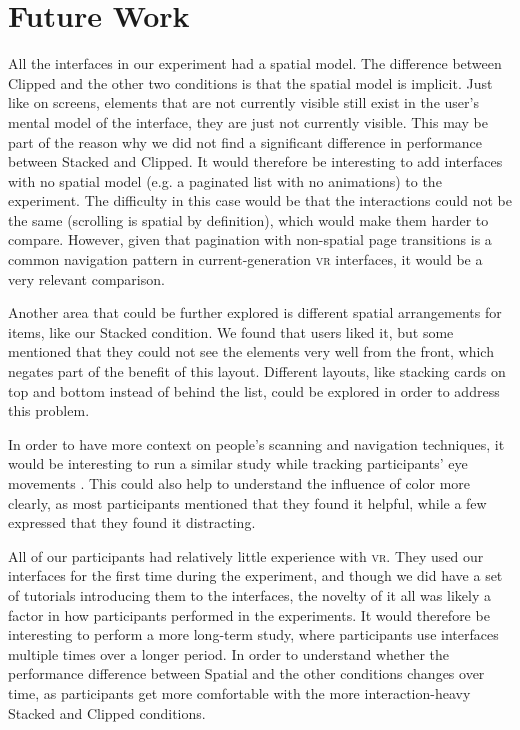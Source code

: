 \documentclass[nobib]{tufte-book} %
\begin{document}
\section{Future Work}
All the interfaces in our experiment had a spatial model. The difference between Clipped and the other two conditions is that the spatial model is implicit. Just like on screens, elements that are not currently visible still exist in the user's mental model of the interface, they are just not currently visible. This may be part of the reason why we did not find a significant difference in performance between Stacked and Clipped. It would therefore be interesting to add interfaces with no spatial model (e.g. a paginated list with no animations) to the experiment. The difficulty in this case would be that the interactions could not be the same (scrolling is spatial by definition), which would make them harder to compare. However, given that pagination with non-spatial page transitions is a common navigation pattern in current-generation \textsc{vr} interfaces, it would be a very relevant comparison.

Another area that could be further explored is different spatial arrangements for items, like our Stacked condition. We found that users liked it, but some mentioned that they could not see the elements very well from the front, which negates part of the benefit of this layout. Different layouts, like stacking cards on top and bottom instead of behind the list, could be explored in order to address this problem.

In order to have more context on people's scanning and navigation techniques, it would be interesting to run a similar study while tracking participants' eye movements \cite{card1984visual}. This could also help to understand the influence of color more clearly, as most participants mentioned that they found it helpful, while a few expressed that they found it distracting.

All of our participants had relatively little experience with \textsc{vr}. They used our interfaces for the first time during the experiment, and though we did have a set of tutorials introducing them to the interfaces, the novelty of it all was likely a factor in how participants performed in the experiments. It would therefore be interesting to perform a more long-term study, where participants use interfaces multiple times over a longer period. In order to understand whether the performance difference between Spatial and the other conditions changes over time, as participants get more comfortable with the more interaction-heavy Stacked and Clipped conditions.
\end{document}
